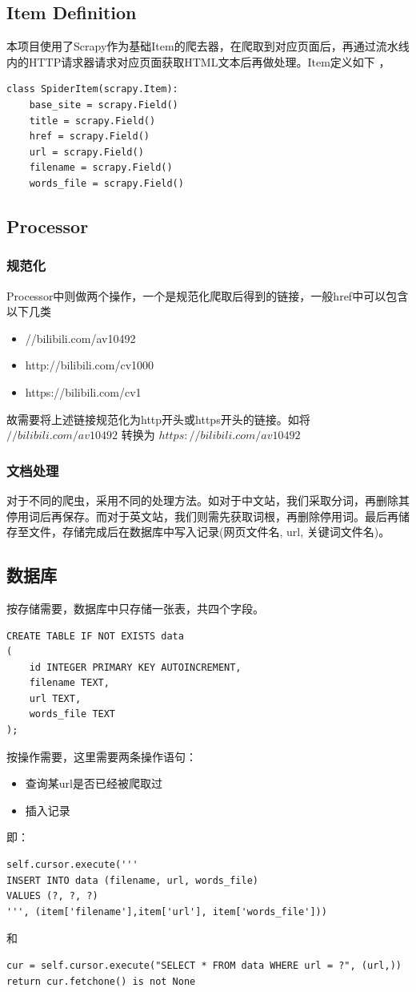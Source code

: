 \documentclass{article}
\begin{document}
\begin{CJK*}{UTF8}{gbsn}
\subsection{Item Definition}
本项目使用了Scrapy作为基础Item的爬去器，在爬取到对应页面后，再通过流水线内的HTTP请求器请求对应页面获取HTML文本后再做处理。Item定义如下 ，
\begin{lstlisting}
class SpiderItem(scrapy.Item):
    base_site = scrapy.Field()
    title = scrapy.Field()
    href = scrapy.Field()
    url = scrapy.Field()
    filename = scrapy.Field()
    words_file = scrapy.Field()
\end{lstlisting}


\subsection{Processor}
\subsubsection{规范化}
Processor中则做两个操作，一个是规范化爬取后得到的链接，一般href中可以包含以下几类
\begin{itemize}
  \item //bilibili.com/av10492
  \item http://bilibili.com/cv1000
  \item https://bilibili.com/cv1
\end{itemize}
故需要将上述链接规范化为http开头或https开头的链接。如将
$//bilibili.com/av10492$ 转换为 $https://bilibili.com/av10492$
\subsubsection{文档处理}
对于不同的爬虫，采用不同的处理方法。如对于中文站，我们采取分词，再删除其停用词后再保存。而对于英文站，我们则需先获取词根，再删除停用词。最后再储存至文件，存储完成后在数据库中写入记录(网页文件名, url, 关键词文件名)。
\subsection{数据库}
按存储需要，数据库中只存储一张表，共四个字段。
\begin{lstlisting}
CREATE TABLE IF NOT EXISTS data
(
    id INTEGER PRIMARY KEY AUTOINCREMENT,
    filename TEXT,
    url TEXT,
    words_file TEXT
);
\end{lstlisting}
按操作需要，这里需要两条操作语句：
\begin{itemize}
	\item 查询某url是否已经被爬取过
	\item 插入记录
\end{itemize}
即：
\begin{lstlisting}
self.cursor.execute('''
INSERT INTO data (filename, url, words_file)
VALUES (?, ?, ?)
''', (item['filename'],item['url'], item['words_file']))
\end{lstlisting}
和
\begin{lstlisting}
cur = self.cursor.execute("SELECT * FROM data WHERE url = ?", (url,))
return cur.fetchone() is not None
\end{lstlisting}



\end{CJK*}
\end{document}
